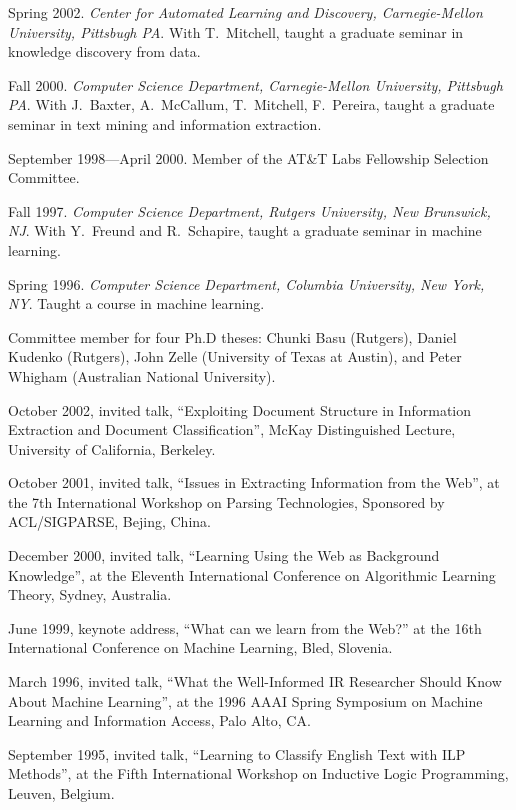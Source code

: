 \newpage

\bi
\item Spring 2002. {\it Center for Automated Learning and Discovery,
Carnegie-Mellon University, Pittsbugh PA}. With T.~Mitchell,
taught a graduate seminar in knowledge discovery from data.
\item Fall 2000. {\it Computer Science Department,
Carnegie-Mellon University, Pittsbugh PA}. With 
J.~Baxter, A.~McCallum, T.~Mitchell, F.~Pereira, 
taught a graduate seminar in text mining and 
information extraction.
\item September 1998---April 2000.  Member of the AT\&T Labs
Fellowship Selection Committee.
\item Fall 1997. {\it Computer Science Department,
Rutgers University, New Brunswick, NJ}.  With Y.~Freund and
R.~Schapire, taught a graduate seminar in machine learning.
\item Spring 1996. {\it Computer Science
Department, Columbia University, New York, NY}.
Taught a course in machine learning.
\item Committee member for four Ph.D theses: Chunki Basu (Rutgers), 
Daniel Kudenko (Rutgers), John Zelle (University of Texas at Austin),
and Peter Whigham (Australian National University).
\ei

\bi
\item October 2002, invited talk, ``Exploiting Document Structure in
Information Extraction and Document Classification'', McKay
Distinguished Lecture, University of California, Berkeley.
\item October 2001, invited talk, ``Issues in Extracting Information
from the Web'', at the 7th International Workshop on Parsing
Technologies, Sponsored by ACL/SIGPARSE, Bejing, China.
\item December 2000, invited talk, ``Learning Using the Web as Background Knowledge'',
at the Eleventh International Conference on Algorithmic Learning
Theory, Sydney, Australia.
\item June 1999, keynote address, ``What can we learn from the Web?''
at the 16th International Conference on Machine Learning, Bled,
Slovenia.
\item March 1996, invited talk, ``What the Well-Informed IR
Researcher Should Know About Machine Learning'', at the 1996
AAAI Spring Symposium on Machine Learning and Information Access,
Palo Alto, CA.
\item September 1995, invited talk, 
``Learning to Classify English Text with ILP
Methods'', at the Fifth International Workshop on Inductive Logic
Programming, Leuven, Belgium.
\ei

